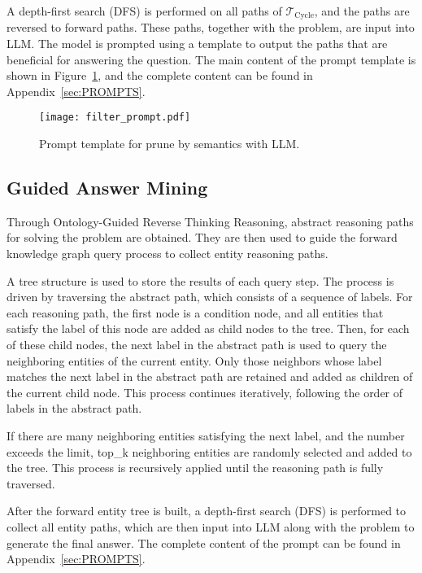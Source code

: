 A depth-first search (DFS) is performed on all paths of \( \mathcal{T}_{\text{Cycle}} \), and the paths are reversed to forward paths. These paths, together with the problem, are input into LLM. The model is prompted using a template to output the paths that are beneficial for answering the question. The main content of the prompt template is shown in Figure~\ref{fig:filter_prompt}, and the complete content can be found in Appendix~\ref{sec:PROMPTS}.

\begin{figure}[H]
  \centering
  \texttt{[image: filter\_prompt.pdf]}  %
  \caption{Prompt template for prune by semantics with LLM.}  %
  \label{fig:filter_prompt}  %
\end{figure}

\subsection{Guided Answer Mining}

Through Ontology-Guided Reverse Thinking Reasoning, abstract reasoning paths for solving the problem are obtained. They are then used to guide the forward knowledge graph query process to collect entity reasoning paths. 

A tree structure is used to store the results of each query step. The process is driven by traversing the abstract path, which consists of a sequence of labels. For each reasoning path, the first node is a condition node, and all entities that satisfy the label of this node are added as child nodes to the tree. Then, for each of these child nodes, the next label in the abstract path is used to query the neighboring entities of the current entity. Only those neighbors whose label matches the next label in the abstract path are retained and added as children of the current child node. This process continues iteratively, following the order of labels in the abstract path.



If there are many neighboring entities satisfying the next label, and the number exceeds the limit, top\_k neighboring entities are randomly selected and added to the tree. This process is recursively applied until the reasoning path is fully traversed.

After the forward entity tree is built, a depth-first search (DFS) is performed to collect all entity paths, which are then input into LLM along with the problem to generate the final answer. The complete content of the prompt can be found in Appendix~\ref{sec:PROMPTS}.



